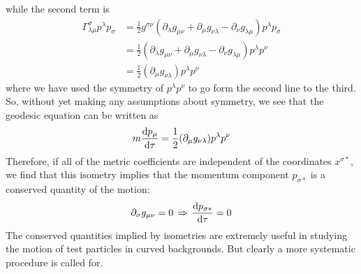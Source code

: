 while the second term is
\begin{align*}
    \Gamma^\sigma_{\lambda\mu}p^\lambda p_\sigma&=\frac{1}{2}g^{\sigma\nu}(\partial_\lambda g_{\mu\nu}+\partial_\mu g_{\nu\lambda}-\partial_\nu g_{\lambda\mu})p^\lambda p_\sigma\\
    &=\frac{1}{2}(\partial_\lambda g_{\mu\nu}+\partial_\mu g_{\nu\lambda}-\partial_\nu g_{\lambda\mu})p^\lambda p^\nu\\
    &=\frac{1}{2}(\partial_\mu g_{\nu\lambda})p^\lambda p^\nu
\end{align*}
where we have used the symmetry of $p^\lambda p^\nu$ to go form the second line to the third. So, without yet making any assumptions about symmetry, we see that the geodesic equation can be written as
\begin{equation*}
    m\dv{p_\mu}{\tau}=\frac{1}{2}(\partial_\mu g_{\nu\lambda})p^\lambda p^\nu
\end{equation*}
Therefore, if all of the metric coefficients are independent of the coordinates $x^{\sigma*}$, we find that this isometry implies that the momentum component $p_{\sigma*}$ is a conserved quantity of the motion:
\begin{equation}\label{3.168}
    \partial_{\sigma} g_{\mu\nu}=0\,\Rightarrow\, \dv{p_{\sigma*}}{\tau}=0
\end{equation}
The conserved quantities implied by isometries are extremely useful in studying the motion of test particles in curved backgrounds. But clearly a more systematic procedure is called for.

